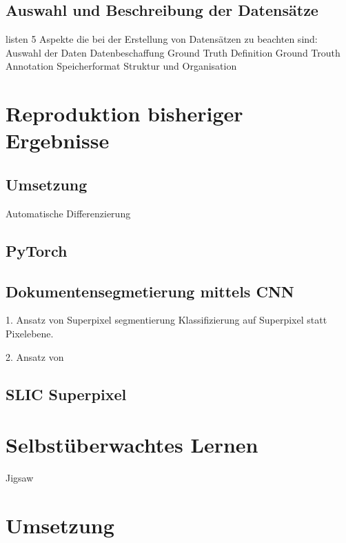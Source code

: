 \section{Auswahl und Beschreibung der Datensätze}
\textcite[985\psqq]{doermann_datasets_2014} listen 5 Aspekte die bei der Erstellung von Datensätzen zu beachten sind:
Auswahl der Daten
Datenbeschaffung
Ground Truth Definition
Ground Trouth Annotation
Speicherformat
Struktur und Organisation

\chapter{Reproduktion bisheriger Ergebnisse}
\label{chap:reproduktion}

\section{Umsetzung}
Automatische Differenzierung

\section{PyTorch}

\section{Dokumentensegmetierung mittels CNN}
1. Ansatz von \textcite{chen_convolutional_2017}
Superpixel segmentierung
Klassifizierung auf Superpixel statt Pixelebene.

2. Ansatz von \autocite{wick_fully_2017}

\section{SLIC Superpixel}
\cite{achanta_slic_2010}

\chapter{Selbstüberwachtes Lernen}
\label{chap:selfsupervised}

Jigsaw
\cite{noroozi_unsupervised_2016}

\chapter{Umsetzung}

